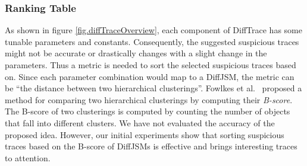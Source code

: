 \subsubsection{Ranking Table}
As shown in figure \ref{fig.diffTraceOverview}, each component of DiffTrace has some tunable parameters and constants.
%
Consequently, the suggested suspicious traces might not be accurate or drastically changes with a slight change in the parameters.
%
Thus a metric is needed to sort the selected suspicious traces based on.
%
Since each parameter combination would map to a DiffJSM, the metric can be ``the distance between two hierarchical clusterings''.
%
Fowlkes et al.~\cite{fowlkes83} proposed a method for comparing two hierarchical clusterings by computing their \textit{B-score}.
%
The B-score of two clusterings is computed by counting the number of objects that fall into different clusters.
%
We have not evaluated the accuracy of the proposed idea.
%
However, our initial experiments show that sorting suspicious traces based on the B-score of DiffJSMs is effective and brings interesting traces to attention.

